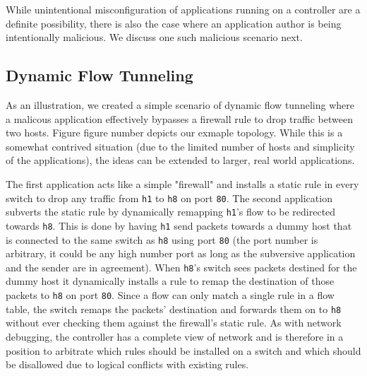 
While unintentional misconfiguration of applications running on a controller are a definite possibility, there is also the case where an application author is being intentionally malicious.
We discuss one such malicious scenario next.

\subsection{Dynamic Flow Tunneling}
As an illustration, we created a simple scenario of dynamic flow tunneling where a malicous application effectively bypasses a firewall rule to drop traffic between two hosts.
Figure {figure number} depicts our exmaple topology.
While this is a somewhat contrived situation (due to the limited number of hosts and simplicity of the applications), the ideas can be extended to larger, real world applications.

The first application acts like a simple "firewall" and installs a static rule in every switch to drop any traffic from \texttt{h1} to \texttt{h8} on port \texttt{80}.
The second application subverts the static rule by dynamically remapping \texttt{h1}'s flow to be redirected towards \texttt{h8}.
This is done by having \texttt{h1} send packets towards a dummy host that is connected to the same switch as \texttt{h8} using port \texttt{80} (the port number is arbitrary, it could be any high number port as long as the subversive application and the sender are in agreement).
When \texttt{h8}'s switch sees packets destined for the dummy host it dynamically installs a rule to remap the destination of those packets to \texttt{h8} on port \texttt{80}.
Since a flow can only match a single rule in a flow table, the switch remaps the packets' destination and forwards them on to \texttt{h8} without ever checking them against the firewall's static rule.
As with network debugging, the controller has a complete view of network and is therefore in a position to arbitrate which rules should be installed on a switch and which should be disallowed due to logical conflicts with existing rules.

